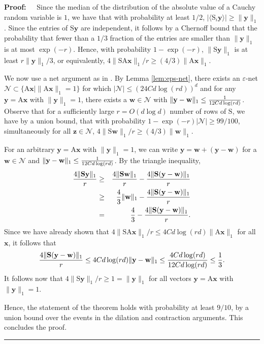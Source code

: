 \documentclass[11pt]{article}
\newenvironment{proof}{\begin{trivlist} \item {\bf Proof:~~}}
  {\qed\end{trivlist}}
\newcommand{\mat}[1]{{\ensuremath{\bm{\mathrm{#1}}}}}
\def\matA{\mat{A}}
\def\matS{\mat{S}}
\def\w{{\mathbf{w}}}
\def\frac#1#2{{#1\over #2}}
\def\qed{\hfill\rule{2mm}{2mm}}
\def\x{{\mathbf x}}
\def\y{{\mathbf y}}
\def\z{{\mathbf z}}
\newcommand{\eps}{\varepsilon}
\begin{document}
\begin{proof}
Since the median of the distribution of the absolute value of a Cauchy random variable is $1$, we have that with 
probability at least $1/2$, $|\langle \matS_i \y \rangle | \geq \|\y\|_1$. Since the entries of $\matS \y$ are independent, 
it follows by a Chernoff bound that the probability that fewer than a $1/3$ fraction
of the entries are smaller than $\|\y\|_1$ is at most $\exp(-r)$. Hence, with probability $1 - \exp(-r)$,
$\|\matS \y\|_1$ is at least $r \|\y\|_1/3$, or equivalently, $4\|\matS \matA \x\|_1/r \geq (4/3) \|\matA \x\|_1$. 

We now use a net argument as in \cite{sw11}. By Lemma \ref{lem:eps-net},
there exists an $\eps$-net $\mathcal{N} \subset \{\matA \x \mid \|\matA \x\|_1 = 1\}$ 
for which $|\mathcal{N}| \leq (24C d \log(rd))^d$ and for any $\y=\matA \x$ with $\|\y\|_1 = 1$, 
there exists a $\w \in \mathcal{N}$ with
$\|\y-\w\|_1 \leq \frac{1}{12C d \log(rd)}$. Observe that for a sufficiently
large $r = O(d \log d)$ number of rows of $\matS$, we have by a union bound, that with probability
$1-\exp(-r) |\mathcal{N}| \geq 99/100$, simultaneously for all $\z \in \mathcal{N}$, 
$4\|\matS \w\|_1/r \geq (4/3) \|\w\|_1$. 

For an arbitrary $\y = \matA \x$ with $\|\y\|_1 = 1$, we can write $\y = \w + (\y-\w)$ for a $\w \in \mathcal{N}$ and 
$\|\y-\w\|_1 \leq \frac{1}{12C d \log(rd)}$. 
By the triangle inequality,  
\begin{eqnarray*}
\frac{4\|\matS \y\|_1}{r} & \geq & \frac{4\|\matS \w\|_1}{r} - \frac{4\|\matS(\y-\w)\|_1}{r}\\
& \geq & \frac{4}{3} \|\w\|_1 - \frac{4\|\matS(\y-\w)\|_1}{r}\\
& = & \frac{4}{3} - \frac{4\|\matS(\y-\w)\|_1}{r}.
\end{eqnarray*}
Since we have already shown that $4\|\matS \matA \x\|_1/r \leq 4C d \log(rd) \|\matA \x\|_1$ for all $\x$, it follows
that 
$$\frac{4\|\matS(\y-\w)\|_1}{r} \leq 4C d \log(rd) \|\y-\w\|_1 \leq \frac{4Cd\log(rd)}{12Cd\log(rd)} \leq \frac{1}{3}.$$
It follows now that $4\|\matS \y\|_1/r \geq 1 = \|\y\|_1$ for all vectors $\y = \matA \x$ with $\|\y\|_1 = 1$. 

Hence, the statement of the theorem holds with probability at least $9/10$, by a union bound over the events in the 
dilation and contraction arguments. This concludes the proof. 
\end{proof}
\end{document}
